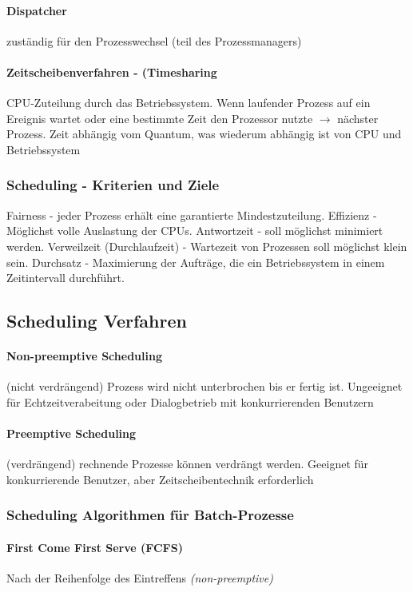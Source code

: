 \documentclass[11pt,a4paper,landscape]{article}
\begin{document}
\begin{multicols*}{3}
	\paragraph{Dispatcher} zuständig für den Prozesswechsel (teil des Prozessmanagers)
	\paragraph{Zeitscheibenverfahren - (Timesharing} CPU-Zuteilung durch das Betriebssystem. Wenn laufender Prozess auf ein Ereignis wartet oder eine bestimmte Zeit den Prozessor nutzte $\rightarrow$ nächster Prozess. Zeit abhängig vom Quantum, was wiederum abhängig ist von CPU und Betriebssystem
	\subsubsection{Scheduling - Kriterien und Ziele}
	Fairness - jeder Prozess erhält eine garantierte Mindestzuteilung. Effizienz - Möglichst volle Auslastung der CPUs. Antwortzeit - soll möglichst minimiert werden. Verweilzeit (Durchlaufzeit) - Wartezeit von Prozessen soll möglichst klein sein. Durchsatz - Maximierung der Aufträge, die ein Betriebssystem in einem Zeitintervall durchführt.
	\subsection{Scheduling Verfahren}
	\paragraph{Non-preemptive Scheduling} (nicht verdrängend) Prozess wird nicht unterbrochen bis er fertig ist. Ungeeignet für Echtzeitverabeitung oder Dialogbetrieb mit konkurrierenden Benutzern
	\paragraph{Preemptive Scheduling} (verdrängend) rechnende Prozesse können verdrängt werden. Geeignet für konkurrierende Benutzer, aber Zeitscheibentechnik erforderlich
	\subsubsection{Scheduling Algorithmen für Batch-Prozesse}
	\paragraph{First Come First Serve (FCFS)} Nach der Reihenfolge des Eintreffens \textit{(non-preemptive)}

\end{multicols*}
\end{document}
